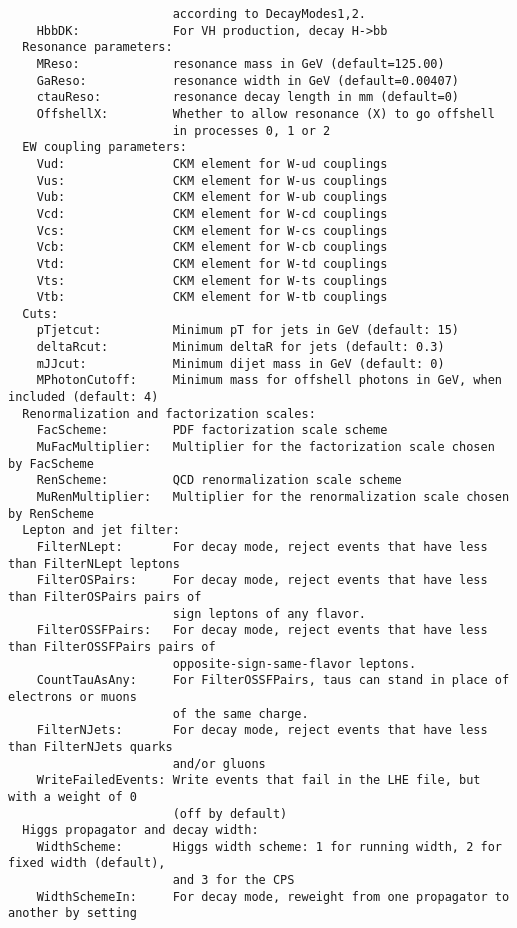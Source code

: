 \documentclass[aps,superscriptaddress,nofootinbib]{revtex4}
\begin{document}
\begin{verbatim}
                       according to DecayModes1,2.
    HbbDK:             For VH production, decay H->bb
  Resonance parameters:
    MReso:             resonance mass in GeV (default=125.00)
    GaReso:            resonance width in GeV (default=0.00407)
    ctauReso:          resonance decay length in mm (default=0)
    OffshellX:         Whether to allow resonance (X) to go offshell
                       in processes 0, 1 or 2
  EW coupling parameters:
    Vud:               CKM element for W-ud couplings
    Vus:               CKM element for W-us couplings
    Vub:               CKM element for W-ub couplings
    Vcd:               CKM element for W-cd couplings
    Vcs:               CKM element for W-cs couplings
    Vcb:               CKM element for W-cb couplings
    Vtd:               CKM element for W-td couplings
    Vts:               CKM element for W-ts couplings
    Vtb:               CKM element for W-tb couplings
  Cuts:
    pTjetcut:          Minimum pT for jets in GeV (default: 15)
    deltaRcut:         Minimum deltaR for jets (default: 0.3)
    mJJcut:            Minimum dijet mass in GeV (default: 0)
    MPhotonCutoff:     Minimum mass for offshell photons in GeV, when included (default: 4)
  Renormalization and factorization scales:
    FacScheme:         PDF factorization scale scheme
    MuFacMultiplier:   Multiplier for the factorization scale chosen by FacScheme
    RenScheme:         QCD renormalization scale scheme
    MuRenMultiplier:   Multiplier for the renormalization scale chosen by RenScheme
  Lepton and jet filter:
    FilterNLept:       For decay mode, reject events that have less than FilterNLept leptons
    FilterOSPairs:     For decay mode, reject events that have less than FilterOSPairs pairs of
                       sign leptons of any flavor.
    FilterOSSFPairs:   For decay mode, reject events that have less than FilterOSSFPairs pairs of
                       opposite-sign-same-flavor leptons.
    CountTauAsAny:     For FilterOSSFPairs, taus can stand in place of electrons or muons
                       of the same charge.
    FilterNJets:       For decay mode, reject events that have less than FilterNJets quarks
                       and/or gluons
    WriteFailedEvents: Write events that fail in the LHE file, but with a weight of 0
                       (off by default)
  Higgs propagator and decay width:
    WidthScheme:       Higgs width scheme: 1 for running width, 2 for fixed width (default),
                       and 3 for the CPS
    WidthSchemeIn:     For decay mode, reweight from one propagator to another by setting

\end{verbatim}
\end{document}
